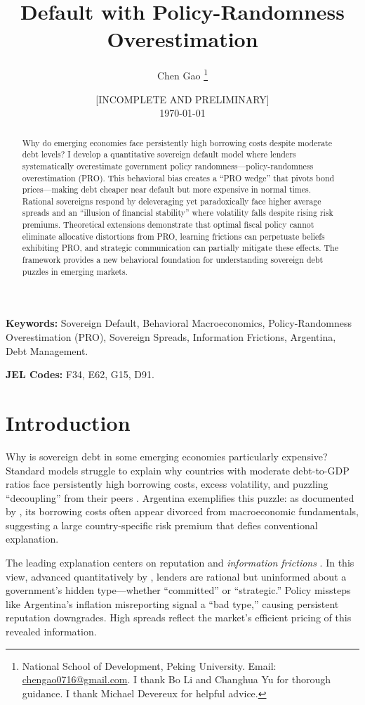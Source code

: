 \documentclass[12pt]{article}
\title{Default with Policy-Randomness Overestimation}
\author{Chen Gao \thanks{National School of Development, Peking University. Email: \url{chengao0716@gmail.com}. I thank Bo Li and Changhua Yu for thorough guidance. I thank Michael Devereux for helpful advice.}}
\date{{\color{red} [INCOMPLETE AND PRELIMINARY]} \\ \today}
\theoremstyle{plain}
\begin{document}
\maketitle

\begin{abstract}
	Why do emerging economies face persistently high borrowing costs despite moderate debt levels? I develop a quantitative sovereign default model where lenders systematically overestimate government policy randomness—policy-randomness overestimation (PRO). This behavioral bias creates a ``PRO wedge'' that pivots bond prices—making debt cheaper near default but more expensive in normal times. Rational sovereigns respond by deleveraging yet paradoxically face higher average spreads and an ``illusion of financial stability'' where volatility falls despite rising risk premiums. Theoretical extensions demonstrate that optimal fiscal policy cannot eliminate allocative distortions from PRO, learning frictions can perpetuate beliefs exhibiting PRO, and strategic communication can partially mitigate these effects. The framework provides a new behavioral foundation for understanding sovereign debt puzzles in emerging markets.
\end{abstract}

\noindent \textbf{Keywords:} Sovereign Default, Behavioral Macroeconomics, Policy-Randomness Overestimation (PRO), Sovereign Spreads, Information Frictions, Argentina, Debt Management.

\noindent \textbf{JEL Codes:} F34, E62, G15, D91.

\clearpage

\section{Introduction}
\label{sec:intro}

Why is sovereign debt in some emerging economies particularly expensive?
Standard models struggle to explain why countries with moderate debt-to-GDP
ratios face persistently high borrowing costs, excess volatility, and puzzling
``decoupling'' from their peers \citep{TomzWright2013,
	MeyerReinhartTrebesch2022}. Argentina exemplifies this puzzle: as documented by
\citep{MorelliMoretti2023}, its borrowing costs often appear divorced from
macroeconomic fundamentals, suggesting a large country-specific risk premium
that defies conventional explanation.

The leading explanation centers on reputation and \textit{information
	frictions} \citep{ColeDowEnglish1995}. In this view, advanced quantitatively by
\citep{MorelliMoretti2023}, lenders are rational but uninformed about a
government's hidden type---whether ``committed'' or ``strategic.'' Policy
missteps like Argentina's inflation misreporting signal a ``bad type,'' causing
persistent reputation downgrades. High spreads reflect the market's efficient
pricing of this revealed information.
\end{document}
